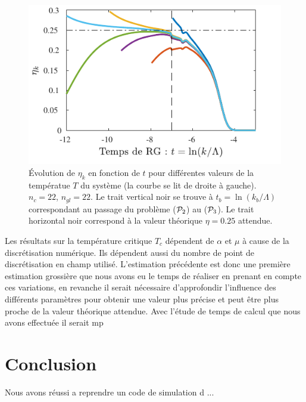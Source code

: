 \documentclass[10.5pt]{article}
\begin{document}
\begin{multicols}{2}
\begin{figure}[H]
\begin{center}
	\includegraphics[width=0.95\columnwidth]{MesuRes.pdf}
\end{center}
\caption{Évolution de $\eta_k$ en fonction de $t$ pour différentes valeurs de la températue $T$ du système (la courbe se lit de droite à gauche). $n_c=22$, $n_{gl} = 22$.  Le trait vertical noir se trouve à $t_b = \ln(k_b/\Lambda)$ correspondant au passage du problème ($\mathcal{P}_2$) au ($\mathcal{P}_3$). Le trait horizontal noir correspond à la valeur théorique $\eta = 0.25$ attendue. }
\label{fig:etaMesu}
\end{figure}

Les résultats sur la température critique $T_c$ dépendent de $\alpha$ et $\mu$ à cause de la discrétisation numérique. Ils dépendent aussi du nombre de point de discrétisation en champ utilisé. L'estimation précédente est donc une première estimation grossière que nous avons eu le temps de réaliser en prenant en compte ces variations, en revanche il serait nécessaire d'approfondir l'influence des différents paramètres pour obtenir une valeur plus précise et peut être plus proche de la valeur théorique attendue. Avec l'étude de temps de calcul que nous avons effectuée il serait mp



\section{Conclusion}

Nous avons réussi a reprendre un code de simulation d ...

\vfill

\pagebreak





\end{multicols}
\end{document}

